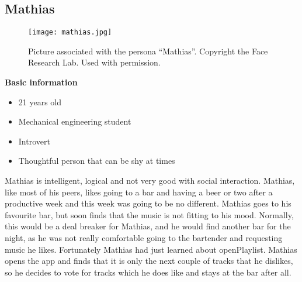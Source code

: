 \subsection{Mathias}
\begin{figure}[hbtp]
  \centering
  \texttt{[image: mathias.jpg]}
  \caption{Picture associated with the persona \enquote{Mathias}. Copyright the Face Research Lab. Used with permission.}\label{fig:mathias}
\end{figure}
\noindent\textbf{Basic information}

\begin{itemize}
\item 21 years old
\item Mechanical engineering student
\item Introvert
\item Thoughtful person that can be shy at times
\end{itemize}

Mathias is intelligent, logical and not very good with social interaction. Mathias, like most of his peers, likes going to a bar and having a beer or two after a productive week and this week was going to be no different. Mathias goes to his favourite bar, but soon finds that the music is not fitting to his mood. Normally, this would be a deal breaker for Mathias, and he would find another bar for the night, as he was not really comfortable going to the bartender and requesting music he likes. Fortunately Mathias had just learned about openPlaylist. Mathias opens the app and finds that it is only the next couple of tracks that he dislikes, so he decides to vote for tracks which he does like and stays at the bar after all.
